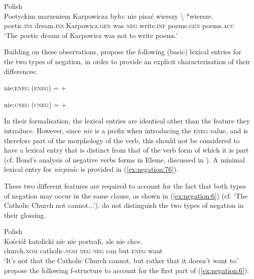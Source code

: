 \documentclass[output=paper,hidelinks]{langscibook}
\begin{document}
\ea 
\label{ex:negation:5}Polish \citep [327]{przepiorkowski2015two}\\
\gll Poetyckim marzeniem Karpowicza było: nie pisać wierszy  \textbackslash{} *wiersze.\\  
    poetic.\textsc{ins} dream.\textsc{ins} Karpowicz.\textsc{gen}  was \textsc{neg} write.\textsc{inf} {poems.\textsc{gen}} {}  { poems.\textsc{acc}}\\ 
\glt `The poetic dream of Karpowicz was not to write poems.'
\z

Building on these observations, \citet [158]{camilleri-sadler:2017} propose the following (basic) lexical entries for the two types of negation, in order to provide an explicit characterisation of their differences:

\ea
\label{ex:negation:15}
nie:\hspace{3 mm}\textsc{eneg} \hspace{3 mm}(\UP \textsc{eneg}) = +\\
\citep [158]{camilleri-sadler:2017}
\z

\ea
\label{ex:negation:16}
nie:\hspace{3 mm}\textsc{cneg} \hspace{3 mm}(\UP \textsc{cneg}) = +\\
\citep [158]{camilleri-sadler:2017}
\z

In their formalisation, the lexical entries are identical other than the feature they introduce. However, since \emph{nie} is a prefix when introducing the \textsc{eneg} value, and is therefore part of the morphology of the verb, this should not be considered to have a lexical entry that is distinct from that of the verb form of which it is part (cf. Bond's \citeyear {Bond2016} analysis of negative verbs forms in Eleme, discussed in ). A minimal lexical entry for \emph{niepisác} is provided in (\ref{ex:negation:76}). 

\ea
\label{ex:negation:76}
\z

These two different features are required to account for the fact that both types of negation may occur in the same clause, as shown in (\ref{ex:negation:6}) (cf. `The Catholic Church not cannot...'). \citet [327]{przepiorkowski2015two} do not distinguish the two types of negation in their glossing.

\ea Polish \citep [327]{przepiorkowski2015two}\\
\label{ex:negation:6}
\gll Kościół katolicki nie nie portrafi, ale nie chce.\\  
    church.\textsc{nom} catholic.\textsc{nom} \textsc{neg}  \textsc{neg} can but \textsc{eneg} want\\ 
\glt `It's not that the Catholic Church cannot, but rather that it doesn't want to.'
\z
\citet [327]{przepiorkowski2015two} propose the following f-structure to account for the first part of (\ref{ex:negation:6}):
\end{document}

